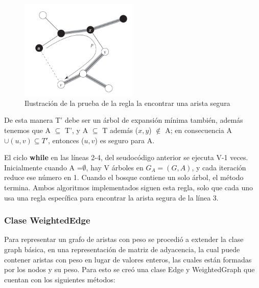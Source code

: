 \documentclass[a4paper, 11pt]{report}
\begin{document}
\begin{figure}[!h]
\centering
\includegraphics[width=0.5\textwidth]{./safeedge.png} 
\caption{Ilustración de la prueba de la regla la encontrar una arista segura}
\label{F:MST3}
\end{figure}

De esta manera T' debe ser un árbol de expansión mínima también, además tenemos que A $\subseteq$ T', y A $\subseteq$ T además ($x, y$) $\notin$ A; en consecuencia A$\cup {(u, v)} \subseteq T'$, entonces ($u, v$) es seguro para A.

El ciclo \textbf{while} en las líneas 2-4, del seudocódigo anterior se ejecuta V-1 veces. Inicialmente cuando A =$ \emptyset$, hay V árboles en $G_A = (G,A)$, y cada iteración reduce ese número en 1. Cuando el bosque contiene un solo árbol, el método termina. Ambos algoritmos implementados siguen esta regla, solo que cada uno usa una regla específica para encontrar la arista segura de la línea 3.

\subsubsection{Clase WeightedEdge}

Para representar un grafo de aristas con peso se procedió a extender la clase graph básica, en una representación de matriz de adyacencia, la cual puede contener aristas con peso en lugar de valores enteros, las cuales están formadas por los nodos y su peso. Para esto se creó una clase Edge y WeightedGraph que cuentan con los siguientes métodos:
\end{document}
